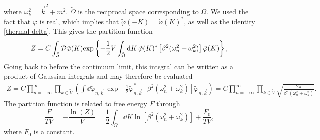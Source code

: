 %
where $\omega_k^2 = \vec k^2 + m^2$.
$\tilde \Omega$ is the reciprocal space corresponding to $\Omega$.
We used the fact that $\varphi$ is real, which implies that $\tilde \varphi(-K) = \tilde \varphi(K)^*$, as well as the identity \autoref{thermal delta}.
This gives the partition function 
%
\begin{equation}
    Z = C \int_{\tilde S} \mathcal D \tilde \varphi(K) 
    \text{exp} \left\{ 
        -  \frac{1}{2} V \int_{\tilde \Omega} \text{d} K \, 
        \tilde \varphi(K)^* \left[\beta^2 (\omega_n^2+ \omega_k^2)\right] \tilde \varphi(K)
     \right\},
\end{equation}
%
Going back to before the continuum limit, this integral can be written as a product of Gaussian integrals and may therefore be evaluated
%
\begin{align*}
    Z = C \prod_{n=-\infty}^\infty \prod_{k \in \tilde V}
    \left(
        \int \dd \tilde \varphi_{n, \vec k} \,
        \exp{
            - \frac{1}{2} \tilde \varphi_{n, \vec k}^*
            \left[\beta^2 (\omega_n^2+ \omega_k^2)\right] 
            \tilde \varphi_{n, \vec k}
            }
    \right)
    = 
    C \prod_{n=-\infty}^\infty \prod_{k \in \tilde V} 
    \sqrt{\frac{2 \pi}{\beta^2 (\omega_n^2 + \omega_k^2)}}.
\end{align*}
%
The partition function is related to free energy $F$ through
%
\begin{equation}
    \label{result free scalar 1}
    \frac{F}{T V}= - \frac{\ln(Z)}{V} = \frac{1}{2} \int_{\tilde \Omega} \dd K \ln[\beta^2(\omega_n^2 + \omega_k^2)] + \frac{F_0}{TV},
\end{equation}
%
where $F_0$ is a constant.

